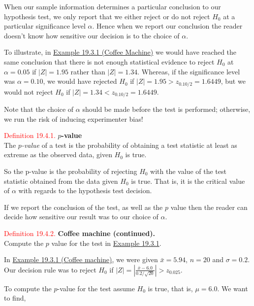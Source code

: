 \documentclass[
]{book}
\begin{document}
When our sample information determines a particular conclusion to our hypothesis test, we only report that we either reject or do not reject \(H_0\) at a particular significance level \(\alpha\). Hence when we report our conclusion the reader doesn't know how sensitive our decision is to the choice of \(\alpha\).

To illustrate, in \protect\hyperlink{Sec_Hypo_Test:ex:coffee_machine}{Example 19.3.1 (Coffee Machine)} we would have reached the same conclusion that there is not enough statistical evidence to reject \(H_0\) at \(\alpha=0.05\) if \(|Z| = 1.95\) rather than \(|Z| = 1.34\). Whereas, if the significance level was \(\alpha = 0.10\), we would have rejected \(H_0\) if \(|Z| = 1.95 > z_{0.10/2} = 1.6449\), but we would not reject \(H_0\) if \(|Z| = 1.34 < z_{0.10/2} = 1.6449\).

Note that the choice of \(\alpha\) should be made before the test is performed; otherwise, we run the risk of inducing experimenter bias!

\leavevmode{}%
\textcolor{red}{Definition 19.4.1.}
{\textbf{\(p\)-value}}\\
The {\(p\)\emph{-value}} of a test is the probability of obtaining a test statistic at least as extreme as the observed data, given \(H_0\) is true.

So the p-value is the probability of rejecting \(H_0\) with the value of the test statistic obtained from the data given \(H_0\) is true. That is, it is the critical value of \(\alpha\) with regards to the hypothesis test decision.

If we report the conclusion of the test, as well as the \(p\) value then the reader can decide how sensitive our result was to our choice of \(\alpha\).

\leavevmode{}%
\textcolor{red}{Definition 19.4.2.}
{\textbf{Coffee machine (continued).}}\\
Compute the \(p\) value for the test in \protect\hyperlink{Sec_Hypo_Test:ex:coffee_machine}{Example 19.3.1}.

In \protect\hyperlink{Sec_Hypo_Test:ex:coffee_machine}{Example 19.3.1 (Coffee machine)}, we were given \(\bar{x}=5.94\), \(n=20\) and \(\sigma=0.2\). Our decision rule was to reject \(H_0\) if \(|Z| = \left| \frac{\bar{x}-6.0}{0.2/\sqrt{20}} \right| > z_{0.025}\).

To compute the \(p\)-value for the test assume \(H_0\) is true, that is, \(\mu=6.0\). We want to find,\\
\end{document}
